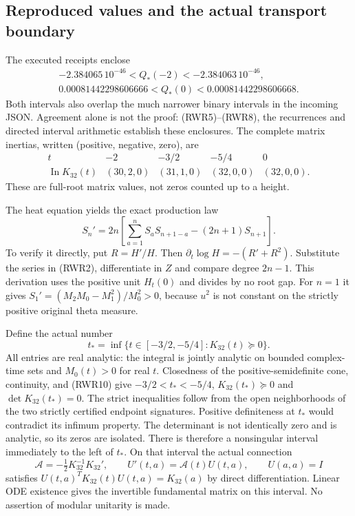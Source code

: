 \subsection{Reproduced values and the actual transport boundary}
The executed receipts enclose
\begin{equation}\tag{RWR9}\begin{gathered}
 -2.384065\,10^{-46}<Q_*(-2)<-2.384063\,10^{-46},\\
 0.00081442298606666<Q_*(0)<0.00081442298606668.\end{gathered}
\end{equation}
Both intervals also overlap the much narrower binary intervals in the
incoming JSON. Agreement alone is not the proof: (RWR5)--(RWR8), the
recurrences and directed interval arithmetic establish these enclosures.
The complete matrix inertias, written (positive, negative, zero), are
\begin{equation}\tag{RWR10}
\begin{array}{c|cccc}
 t&-2&-3/2&-5/4&0\\\hline
 \operatorname{In}K_{32}(t)&(30,2,0)&(31,1,0)&(32,0,0)&(32,0,0).
\end{array}
\end{equation}
These are full-root matrix values, not zeros counted up to a height.

The heat equation yields the exact production law
\begin{equation}\tag{RWR11}
 S_n'=2n\left[\sum_{a=1}^n S_aS_{n+1-a}-(2n+1)S_{n+1}\right].
\end{equation}
To verify it directly, put $R=H'/H$. Then
$\partial_t\log H=-(R'+R^2)$. Substitute the series in (RWR2),
differentiate in $Z$ and compare degree $2n-1$. This derivation uses
the positive unit $H_t(0)$ and divides by no root gap.
For $n=1$ it gives
$S_1'=(M_2M_0-M_1^2)/M_0^2>0$, because $u^2$ is not constant
on the strictly positive original theta measure.

Define the actual number
\begin{equation}\tag{RWR12}
 t_*=\inf\{t\in[-3/2,-5/4]:K_{32}(t)\succeq0\}.
\end{equation}
All entries are real analytic: the integral is jointly analytic on
bounded complex-time sets and $M_0(t)>0$ for real $t$.
Closedness of the positive-semidefinite cone, continuity, and (RWR10)
give $-3/2<t_*<-5/4$, $K_{32}(t_*)\succeq0$ and
$\det K_{32}(t_*)=0$. The strict inequalities follow from the open
neighborhoods of the two strictly certified endpoint signatures.
Positive definiteness at $t_*$ would contradict its infimum property.
The determinant is not identically zero and is analytic, so its zeros
are isolated. There is therefore a nonsingular interval immediately to
the left of $t_*$. On that interval the actual connection
\begin{equation}\tag{RWR13}
 \mathcal A=-\tfrac12K_{32}^{-1}K_{32}',\qquad
 U'(t,a)=\mathcal A(t)U(t,a),\qquad U(a,a)=I
\end{equation}
satisfies $U(t,a)^TK_{32}(t)U(t,a)=K_{32}(a)$ by direct
differentiation. Linear ODE existence gives the invertible fundamental
matrix on this interval. No assertion of modular unitarity is made.

